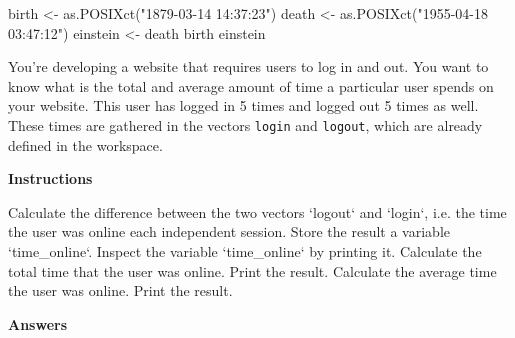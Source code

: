 \documentclass[]{article}
\newcommand{\hlstr}[1]{\textcolor[rgb]{0.251,0.627,0.251}{#1}}%
\newcommand{\hlstd}[1]{\textcolor[rgb]{0.251,0.251,0.251}{#1}}%
\newcommand{\hlkwc}[1]{\textcolor[rgb]{0.251,0.251,0.251}{#1}}%
\newcommand{\hlkwd}[1]{\textcolor[rgb]{0.878,0.439,0.125}{#1}}%
\newenvironment{Shaded}{\begin{myshaded}}{\end{myshaded}}
\newcommand{\KeywordTok}[1]{\hlkwd{#1}}
\newcommand{\DataTypeTok}[1]{\hlkwc{#1}}
\newcommand{\StringTok}[1]{\hlstr{#1}}
\newcommand{\NormalTok}[1]{\hlstd{#1}}
\begin{document}
\begin{Shaded}
\begin{Highlighting}[]
\NormalTok{birth <-}\StringTok{ }\KeywordTok{as.POSIXct}\NormalTok{(}\StringTok{"1879-03-14 14:37:23"}\NormalTok{)}
\NormalTok{death <-}\StringTok{ }\KeywordTok{as.POSIXct}\NormalTok{(}\StringTok{"1955-04-18 03:47:12"}\NormalTok{)}
\NormalTok{einstein <-}\StringTok{ }\NormalTok{death }\OperatorTok{-}\StringTok{ }\NormalTok{birth}
\NormalTok{einstein}
\end{Highlighting}
\end{Shaded}

You're developing a website that requires users to log in and out. You
want to know what is the total and average amount of time a particular
user spends on your website. This user has logged in 5 times and logged
out 5 times as well. These times are gathered in the vectors
\texttt{login} and \texttt{logout}, which are already defined in the
workspace.

\textbf{Instructions}

\begin{Shaded}
\begin{Highlighting}[]
\OperatorTok{*}\StringTok{ }\NormalTok{Calculate the difference between the two vectors }\StringTok{`}\DataTypeTok{logout}\StringTok{`}\NormalTok{ and }\StringTok{`}\DataTypeTok{login}\StringTok{`}\NormalTok{, i.e. the time the user was online }\NormalTok{ each independent session. Store the result }\NormalTok{ a variable }\StringTok{`}\DataTypeTok{time_online}\StringTok{`}\NormalTok{.}
\OperatorTok{*}\StringTok{ }\NormalTok{Inspect the variable }\StringTok{`}\DataTypeTok{time_online}\StringTok{`}\NormalTok{ by printing it.}
\OperatorTok{*}\StringTok{ }\NormalTok{Calculate the total time that the user was online. Print the result.}
\OperatorTok{*}\StringTok{ }\NormalTok{Calculate the average time the user was online. Print the result.}
\end{Highlighting}
\end{Shaded}

\textbf{Answers}
\end{document}
